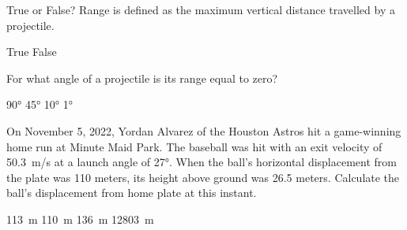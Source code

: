 \documentclass[dvipsnames]{exam}
\begin{document}
\begin{questions}
\question
True or False? Range is defined as the maximum vertical distance travelled by a projectile. 

\begin{choices}
    \choice True
    \correctchoice False
\end{choices}

\question
For what angle of a projectile is its range equal to zero?

\begin{randomizechoices}
    \correctchoice \ang{90}
    \choice \ang{45}
    \choice \ang{10}
    \choice \ang{1}
\end{randomizechoices}

\clearpage
\question
On November 5, 2022, Yordan Alvarez of the Houston Astros hit a game-winning home run at Minute Maid Park. The baseball was hit with an exit velocity of \SI{50.3}{m/s} at a launch angle of \ang{27}. When the ball's horizontal displacement from the plate was 110 meters, its height above ground was 26.5 meters. Calculate the ball's displacement from home plate at this instant.

\vspace{1em}

\begin{minipage}{6cm}
    \centering 
    \begin{randomizechoices}
        \correctchoice \SI{113}{m}
        \choice \SI{110}{m}
        \choice \SI{136}{m}
        \choice \SI{12803}{m}
    \end{randomizechoices}
\end{minipage}%
\begin{minipage}{6cm}
    \centering 
    \begin{center}
    \end{center}    
\end{minipage}%


\end{questions}
\end{document}
